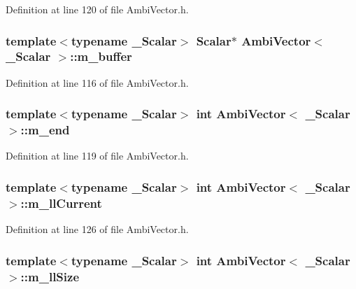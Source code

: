 Definition at line 120 of file Ambi\-Vector.\-h.

\hypertarget{class_ambi_vector_a2262e9c293c67b08455c7cac433949ca}{
\subsubsection[{m\-\_\-buffer}]{\setlength{\rightskip}{0pt plus 5cm}template$<$typename \-\_\-\-Scalar$>$ {\bf Scalar}$\ast$ {\bf Ambi\-Vector}$<$ \-\_\-\-Scalar $>$\-::m\-\_\-buffer\hspace{0.3cm}{\ttfamily [protected]}}}\label{class_ambi_vector_a2262e9c293c67b08455c7cac433949ca}


Definition at line 116 of file Ambi\-Vector.\-h.

\hypertarget{class_ambi_vector_adb2a2a9f06dbd64a10e99e18fea3abad}{
\subsubsection[{m\-\_\-end}]{\setlength{\rightskip}{0pt plus 5cm}template$<$typename \-\_\-\-Scalar$>$ {\bf int} {\bf Ambi\-Vector}$<$ \-\_\-\-Scalar $>$\-::m\-\_\-end\hspace{0.3cm}{\ttfamily [protected]}}}\label{class_ambi_vector_adb2a2a9f06dbd64a10e99e18fea3abad}


Definition at line 119 of file Ambi\-Vector.\-h.

\hypertarget{class_ambi_vector_aa83e38676f9bb793b1d6ca818575d28c}{
\subsubsection[{m\-\_\-ll\-Current}]{\setlength{\rightskip}{0pt plus 5cm}template$<$typename \-\_\-\-Scalar$>$ {\bf int} {\bf Ambi\-Vector}$<$ \-\_\-\-Scalar $>$\-::m\-\_\-ll\-Current\hspace{0.3cm}{\ttfamily [protected]}}}\label{class_ambi_vector_aa83e38676f9bb793b1d6ca818575d28c}


Definition at line 126 of file Ambi\-Vector.\-h.

\hypertarget{class_ambi_vector_a8dd2e8783525aaff75ae08b03e1db603}{
\subsubsection[{m\-\_\-ll\-Size}]{\setlength{\rightskip}{0pt plus 5cm}template$<$typename \-\_\-\-Scalar$>$ {\bf int} {\bf Ambi\-Vector}$<$ \-\_\-\-Scalar $>$\-::m\-\_\-ll\-Size\hspace{0.3cm}{\ttfamily [protected]}}}\label{class_ambi_vector_a8dd2e8783525aaff75ae08b03e1db603}


